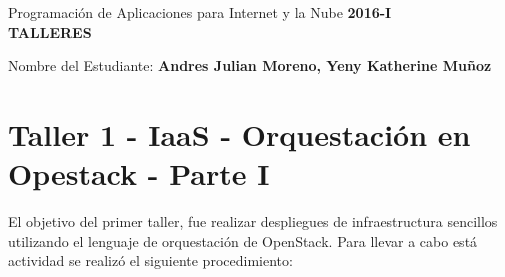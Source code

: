 \documentclass[10pt]{article}   			%
\begin{document}
	\renewcommand{\headrulewidth}{0.5pt}

	\thispagestyle{empty}						%
	\begin{center}
		\large {Programación de Aplicaciones para Internet y la Nube
			\hspace{5 cm}\textbf{2016-I}}
		\bigskip  
		\textbf{
			\LARGE{\\TALLERES}}\\								%
	\end{center}	
	\begin{flushright}	
		\bigskip	
		Nombre del Estudiante: \textbf{Andres Julian Moreno, Yeny Katherine Muñoz}			%
	\end{flushright} 
	
\section{Taller 1 - IaaS - Orquestación en Opestack - Parte I}

El objetivo del primer taller, fue realizar despliegues de infraestructura sencillos utilizando el lenguaje de orquestación de OpenStack. Para llevar a cabo está actividad se realizó el siguiente procedimiento:
\end{document}
